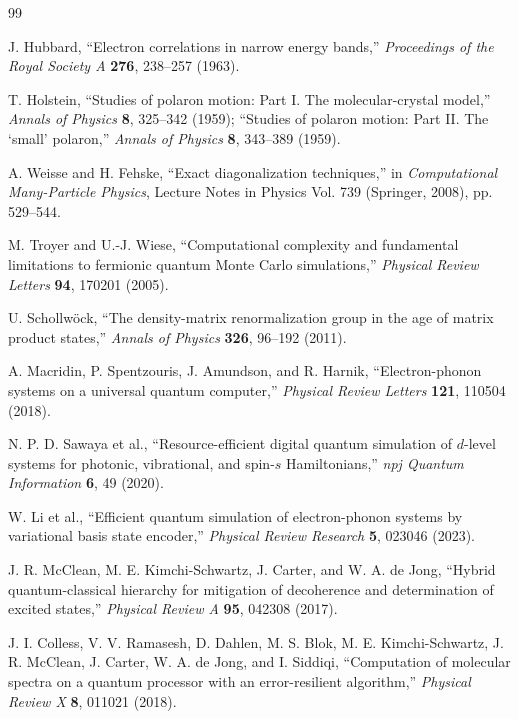 \documentclass[
  reprint,
  amsmath,
  amssymb,
  aps,
  pra,
  nofootinbib,
  superscriptaddress,
  floatfix
]{revtex4-2}
\begin{document}
\begin{thebibliography}{99}

J. Hubbard,
``Electron correlations in narrow energy bands,''
\emph{Proceedings of the Royal Society A} \textbf{276}, 238--257 (1963).

T. Holstein,
``Studies of polaron motion: Part I. The molecular-crystal model,''
\emph{Annals of Physics} \textbf{8}, 325--342 (1959);
``Studies of polaron motion: Part II. The `small' polaron,''
\emph{Annals of Physics} \textbf{8}, 343--389 (1959).

A. Weisse and H. Fehske,
``Exact diagonalization techniques,''
in \emph{Computational Many-Particle Physics}, Lecture Notes in Physics Vol. 739 (Springer, 2008), pp. 529--544.

M. Troyer and U.-J. Wiese,
``Computational complexity and fundamental limitations to fermionic quantum Monte Carlo simulations,''
\emph{Physical Review Letters} \textbf{94}, 170201 (2005).

U. Schollw\"ock,
``The density-matrix renormalization group in the age of matrix product states,''
\emph{Annals of Physics} \textbf{326}, 96--192 (2011).

A. Macridin, P. Spentzouris, J. Amundson, and R. Harnik,
``Electron-phonon systems on a universal quantum computer,''
\emph{Physical Review Letters} \textbf{121}, 110504 (2018).

N. P. D. Sawaya et al.,
``Resource-efficient digital quantum simulation of $d$-level systems for photonic, vibrational, and spin-$s$ Hamiltonians,''
\emph{npj Quantum Information} \textbf{6}, 49 (2020).

W. Li et al.,
``Efficient quantum simulation of electron-phonon systems by variational basis state encoder,''
\emph{Physical Review Research} \textbf{5}, 023046 (2023).

J. R. McClean, M. E. Kimchi-Schwartz, J. Carter, and W. A. de Jong,
``Hybrid quantum-classical hierarchy for mitigation of decoherence and determination of excited states,''
\emph{Physical Review A} \textbf{95}, 042308 (2017).

J. I. Colless, V. V. Ramasesh, D. Dahlen, M. S. Blok, M. E. Kimchi-Schwartz, J. R. McClean, J. Carter, W. A. de Jong, and I. Siddiqi,
``Computation of molecular spectra on a quantum processor with an error-resilient algorithm,''
\emph{Physical Review X} \textbf{8}, 011021 (2018).


\end{thebibliography}
\end{document}
